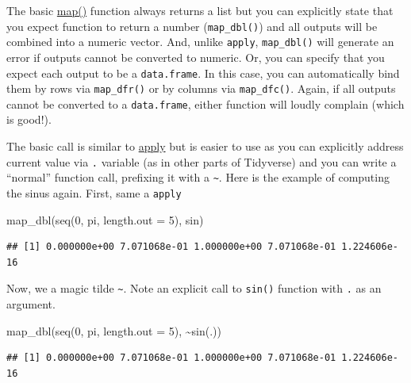 \documentclass[
]{book}
\newenvironment{Shaded}{\begin{snugshade}}{\end{snugshade}}
\newcommand{\AttributeTok}[1]{\textcolor[rgb]{0.77,0.63,0.00}{#1}}
\newcommand{\DecValTok}[1]{\textcolor[rgb]{0.00,0.00,0.81}{#1}}
\newcommand{\FunctionTok}[1]{\textcolor[rgb]{0.00,0.00,0.00}{#1}}
\newcommand{\NormalTok}[1]{#1}
\newcommand{\SpecialCharTok}[1]{\textcolor[rgb]{0.00,0.00,0.00}{#1}}
\begin{document}
The basic \href{https://purrr.tidyverse.org/reference/map.html}{map()} function always returns a list but you can explicitly state that you expect function to return a number (\texttt{map\_dbl()}) and all outputs will be combined into a numeric vector. And, unlike \texttt{apply}, \texttt{map\_dbl()} will generate an error if outputs cannot be converted to numeric. Or, you can specify that you expect each output to be a \texttt{data.frame}. In this case, you can automatically bind them by rows via \texttt{map\_dfr()} or by columns via \texttt{map\_dfc()}. Again, if all outputs cannot be converted to a \texttt{data.frame}, either function will loudly complain (which is good!).

The basic call is similar to \protect\hyperlink{apply}{apply} but is easier to use as you can explicitly address current value via \texttt{.} variable (as in other parts of Tidyverse) and you can write a ``normal'' function call, prefixing it with a \texttt{\textasciitilde{}}. Here is the example of computing the sinus again. First, same a \texttt{apply}

\begin{Shaded}
\begin{Highlighting}[]
\FunctionTok{map\_dbl}\NormalTok{(}\FunctionTok{seq}\NormalTok{(}\DecValTok{0}\NormalTok{, pi, }\AttributeTok{length.out =} \DecValTok{5}\NormalTok{), sin)}
\end{Highlighting}
\end{Shaded}

\begin{verbatim}
## [1] 0.000000e+00 7.071068e-01 1.000000e+00 7.071068e-01 1.224606e-16
\end{verbatim}

Now, we a magic tilde \texttt{\textasciitilde{}}. Note an explicit call to \texttt{sin()} function with \texttt{.} as an argument.

\begin{Shaded}
\begin{Highlighting}[]
\FunctionTok{map\_dbl}\NormalTok{(}\FunctionTok{seq}\NormalTok{(}\DecValTok{0}\NormalTok{, pi, }\AttributeTok{length.out =} \DecValTok{5}\NormalTok{), }\SpecialCharTok{\textasciitilde{}}\FunctionTok{sin}\NormalTok{(.))}
\end{Highlighting}
\end{Shaded}

\begin{verbatim}
## [1] 0.000000e+00 7.071068e-01 1.000000e+00 7.071068e-01 1.224606e-16
\end{verbatim}
\end{document}
